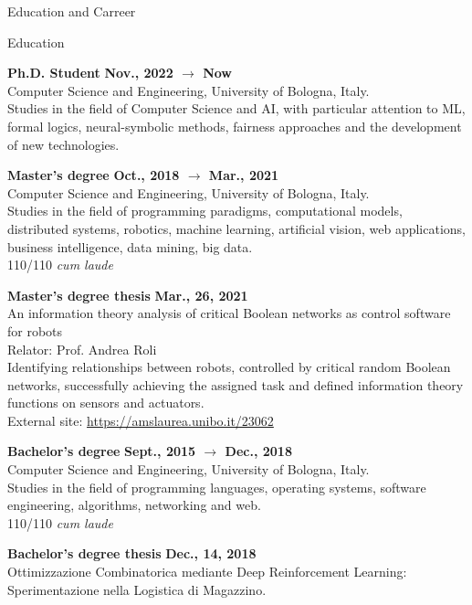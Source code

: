 \documentclass{resume} %
\begin{document}
\begin{rSection}{Education and Carreer}
\begin{rSubsection2}{Education}
            \item\textbf{ Ph.D. Student }\hfill \textbf{Nov., 2022 $\rightarrow$ Now}
            \\Computer Science and Engineering, University of Bologna, Italy.
            \\Studies in the field of Computer Science and AI, with particular attention to ML, formal logics, neural-symbolic methods, fairness approaches and the development of new technologies.
            \item\textbf{ Master's degree }\hfill \textbf{Oct., 2018 $\rightarrow$ Mar., 2021}
            \\Computer Science and Engineering, University of Bologna, Italy.
            \\Studies in the field of programming paradigms, computational models, distributed systems, robotics, machine learning, artificial vision, web applications, business intelligence, data mining, big data.
            \\110/110 \emph{cum laude}
            \item\textbf{ Master's degree thesis }\hfill \textbf{Mar., 26, 2021}
            \\An information theory analysis of critical Boolean networks as control software for robots
            \\Relator: Prof. Andrea Roli
            \\Identifying relationships between robots, controlled by critical random Boolean networks, successfully achieving the assigned task and defined information theory functions on sensors and actuators.
            \\External site: \url{https://amslaurea.unibo.it/23062}
            \item\textbf{ Bachelor's degree }\hfill \textbf{Sept., 2015 $\rightarrow$ Dec., 2018}
            \\Computer Science and Engineering, University of Bologna, Italy.
            \\Studies in the field of programming languages, operating systems, software engineering, algorithms, networking and web.
            \\110/110 \emph{cum laude}
            \item\textbf{ Bachelor's degree thesis }\hfill \textbf{Dec., 14, 2018}
            \\Ottimizzazione Combinatorica mediante Deep Reinforcement Learning: Sperimentazione nella Logistica di Magazzino.

\end{rSubsection2}
\end{rSection}
\end{document}
